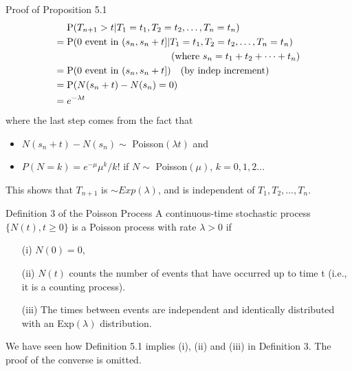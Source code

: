 \documentclass[letterpaper,handout, mathserif]{beamer}
\def\p{\mathrm P}
\begin{document}
\begin{frame}{Proof of Proposition 5.1}
\begin{align*}
&\p(T_{n+1} > t |T_1 = t_1, T_2=t_2,\ldots,T_n=t_n)\\
={}& \p(0\text{ event in }(s_n, s_n + t] |T_1 = t_1, T_2=t_2,\ldots,T_n=t_n)\\
&\hspace{1.5in}(\text{where }s_n=t_1+t_2+\cdots+t_n)\\
={}& \p(0 \text{ event in }(s_n, s_n + t ]) \quad (\text{by indep increment})\\
={}& \p(N(s_n + t)-N(s_n)=0)\\
={}& e^{-\lambda t}
\end{align*}
where the last step comes from the fact that
\begin{itemize}
\item $N(s_n + t)-N(s_n)\sim$ Poisson$(\lambda t)$ and
\item $P(N = k) = e^{-\mu}\mu^k/k!$ if $N\sim$ Poisson$(\mu)$, $k=0,1,2\ldots$
\end{itemize}
This shows that $T_{n+1}$ is $\sim Exp(\lambda)$, and is independent of $T_1,T_2,\ldots,T_n$.
\end{frame}
\begin{frame}{Definition 3 of the Poisson Process}
A continuous-time stochastic process $\{N(t), t\ge 0\}$ is a Poisson process with rate $\lambda>0$  if
\begin{itemize}
\item [(i)] $N(0)=0$,
\item [(ii)] $N(t)$ counts the number of events that have occurred up to time
t (i.e., it is a counting process).
\item [(iii)] The times between events are independent and identically distributed
with an Exp$(\lambda)$ distribution.
\end{itemize}\bigskip
We have seen how Definition 5.1 implies (i), (ii) and (iii) in Definition 3.
The proof of the converse is omitted.
\end{frame}
\end{document}
